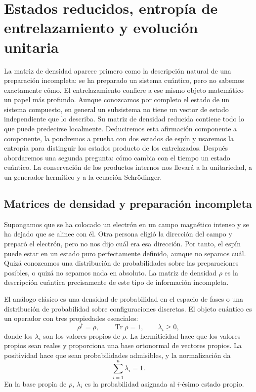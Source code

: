 \chapter{Estados reducidos, entropía de entrelazamiento y evolución unitaria}

La matriz de densidad aparece primero como la descripción natural de una preparación incompleta: se ha preparado un sistema cuántico, pero no sabemos exactamente cómo. El entrelazamiento confiere a ese mismo objeto matemático un papel más profundo. Aunque conozcamos por completo el estado de un sistema compuesto, en general un subsistema no tiene un vector de estado independiente que lo describa. Su matriz de densidad reducida contiene todo lo que puede predecirse localmente. Deduciremos esta afirmación componente a componente, la pondremos a prueba con dos estados de espín y usaremos la entropía para distinguir los estados producto de los entrelazados. Después abordaremos una segunda pregunta: cómo cambia con el tiempo un estado cuántico. La conservación de los productos internos nos llevará a la unitariedad, a un generador hermítico y a la ecuación Schr\"odinger.

\section{Matrices de densidad y preparación incompleta}

Supongamos que se ha colocado un electrón en un campo magnético intenso y se ha dejado que se alinee con él. Otra persona eligió la dirección del campo y preparó el electrón, pero no nos dijo cuál era esa dirección. Por tanto, el espín puede estar en un estado puro perfectamente definido, aunque no sepamos cuál. Quizá conozcamos una distribución de probabilidades sobre las preparaciones posibles, o quizá no sepamos nada en absoluto. La matriz de densidad \(\rho\) es la descripción cuántica precisamente de este tipo de información incompleta.

El análogo clásico es una densidad de probabilidad en el espacio de fases o una distribución de probabilidad sobre configuraciones discretas. El objeto cuántico es un operador con tres propiedades esenciales:
\begin{equation}
\rho^\dagger=\rho,
\qquad
\operatorname{Tr}\rho=1,
\qquad
\lambda_i\geq 0,
\end{equation}
donde los \(\lambda_i\) son los valores propios de \(\rho\). La hermiticidad hace que los valores propios sean reales y proporciona una base ortonormal de vectores propios. La positividad hace que sean probabilidades admisibles, y la normalización da
\begin{equation}
\sum_{i=1}^{n}\lambda_i=1.
\end{equation}
En la base propia de \(\rho\), \(\lambda_i\) es la probabilidad asignada al \(i\)-ésimo estado propio.

